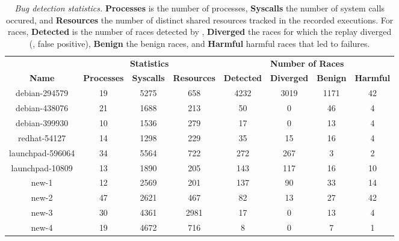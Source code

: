 \begin{table}[t]
\centering
\setlength{\tabcolsep}{3pt}

\begin{tabular}{c|ccc|cccc}
{\bf } &
  \multicolumn{3}{|c}{\bf Statistics} &
  \multicolumn{4}{|c}{\bf Number of Races} \\
  {\bf Name} & {\bf Processes} & {\bf Syscalls} & {\bf Resources} & 
  {\bf Detected} & {\bf Diverged} & {\bf Benign} & {\bf Harmful} \\
\hline

debian-294579    &  19  &  5275  &  658   &  4232  &  3019  &  1171 &  42  \\
debian-438076    &  21  &  1688  &  213   &  50    &  0     &  46   &  4   \\
debian-399930    &  10  &  1536  &  279   &  17    &  0     &  13   &  4   \\
redhat-54127     &  14  &  1298  &  229   &  35    &  15    &  16   &  4   \\
launchpad-596064 &  34  &  5564  &  722   &  272   &  267   &  3    &  2   \\
launchpad-10809  &  13  &  1890  &  205   &  143   &  117   &  16   &  10  \\
new-1            &  12  &  2569  &  201   &  137   &  90    &  33   &  14  \\
new-2            &  47  &  2621  &  467   &  82    &  13    &  27   &  42  \\
new-3            &  30  &  4361  &  2981  &  17    &  0     &  13   &  4   \\
new-4            &  19  &  4672  &  716   &  8     &  0     &  7    &  1   \\
\end{tabular}

\caption{{\em Bug detection statistics.}  {\bf Processes} is the
  number of processes, {\bf Syscalls} the number of system calls
  occured, and {\bf Resources} the number of distinct shared resources
  tracked in the recorded executions. For races, {\bf Detected} is the
  number of races detected by \racepro, {\bf Diverged} the races for which
  the replay diverged (\ie, false positive), {\bf Benign} the benign
  races, and {\bf Harmful} harmful races that led to failures.} \label{racepro:tab:bug-stat}

\end{table}



